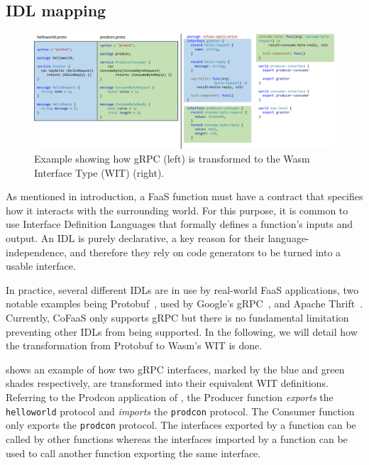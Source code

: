 


\subsection{IDL mapping}
\label{es:subsec:idl-mapping}

\begin{figure}
  \centering
  \includegraphics[width=\textwidth]{figures/idf_transformation}
  \caption{\label{es:fig:wit-transformation} Example showing how gRPC (left) is transformed to the Wasm Interface Type (WIT) (right).}
\end{figure}

As mentioned in introduction, a FaaS function must have a contract that specifies how it interacts with the surrounding world. For this purpose, it is common to use Interface Definition Languages that formally defines a function's inputs and output. An IDL is purely declarative, a key reason for their language-independence, and therefore they rely on code generators to be turned into a usable interface.

In practice, several different IDLs are in use by real-world FaaS applications, two notable examples being Protobuf~\cite{protobuf}, used by Google's gRPC~\cite{grpc}, and Apache Thrift~\cite{thrift}. Currently, CoFaaS only supports gRPC but there is no fundamental limitation preventing other IDLs from being supported. In the following, we will detail how the transformation from Protobuf to Wasm's WIT is done.

 shows an example of how two gRPC interfaces, marked by the blue and green shades respectively, are transformed into their equivalent WIT definitions. Referring to the Prodcon application of , the Producer function \emph{exports} the \texttt{helloworld} protocol and \emph{imports} the \texttt{prodcon} protocol. The Consumer function only exports the \texttt{prodcon} protocol. The interfaces exported by a function can be called by other functions whereas the interfaces imported by a function can be used to call another function exporting the same interface.

